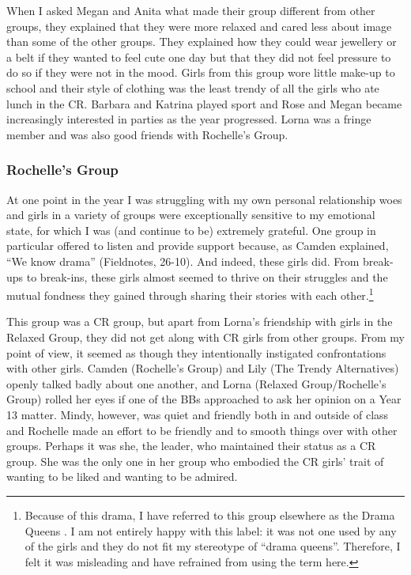 
When I asked Megan and Anita what made their group different from other groups, they explained that they were more relaxed and cared less about image than some of the other groups.  They explained how they could wear jewellery or a belt if they wanted to feel cute one day but that they did not feel pressure to do so if they were not in the mood.  Girls from this group wore little make-up to school and their style of clothing was the least trendy of all the girls who ate lunch in the CR.  Barbara and Katrina played sport and Rose and Megan became increasingly interested in parties as the year progressed.  Lorna was a fringe member and was also good friends with Rochelle's Group.

\subsubsection{Rochelle's Group}
At one point in the year I was struggling with my own personal relationship woes and girls in a variety of groups were exceptionally sensitive to my emotional state, for which I was (and continue to be) extremely grateful.  One group in particular offered to listen and provide support because, as Camden explained, ``We know drama'' (Fieldnotes, 26-10).  And indeed, these girls did.  From break-ups to break-ins, these girls almost seemed to thrive on their struggles and the mutual fondness they gained through sharing their stories with each other.\footnote{Because of this drama, I have referred to this group elsewhere as the Drama Queens \cite{drager2008lsa}.  I am not entirely happy with this label: it was not one used by any of the girls and they do not fit my stereotype of ``drama queens''. Therefore, I felt it was misleading and have refrained from using the term here.}

This group was a CR group, but apart from Lorna's friendship with girls in the Relaxed Group, they did not get along with CR girls from other groups.  From my point of view, it seemed as though they intentionally instigated confrontations with other girls.  Camden (Rochelle's Group) and Lily (The Trendy Alternatives) openly talked badly about one another, and Lorna (Relaxed Group/Rochelle's Group) rolled her eyes if one of the BBs approached to ask her opinion on a Year 13 matter.  Mindy, however, was quiet and friendly both in and outside of class and Rochelle made an effort to be friendly and to smooth things over with other groups.  Perhaps it was she, the leader, who maintained their status as a CR group.  She was the only one in her group who embodied the CR girls' trait of wanting to be liked and wanting to be admired.


